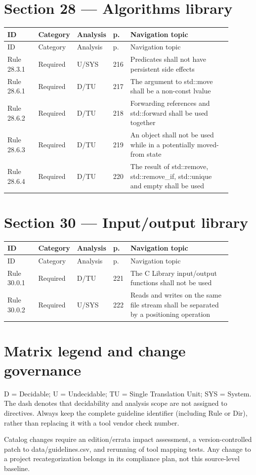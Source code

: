 \documentclass[10pt,letterpaper]{article}
\begin{document}
\section{Section 28 --- Algorithms library}
\small\setlength{\tabcolsep}{3pt}\renewcommand{\arraystretch}{1.15}
\begin{longtable}{p{0.14\linewidth}p{0.14\linewidth}p{0.1\linewidth}p{0.045\linewidth}p{0.475\linewidth}}
\toprule
ID & Category & Analysis & p. & Navigation topic\\ \midrule
\endfirsthead
\toprule
ID & Category & Analysis & p. & Navigation topic\\ \midrule
\endhead
Rule 28.3.1 & Required & U/SYS & 216 & Predicates shall not have persistent side effects\\
Rule 28.6.1 & Required & D/TU & 217 & The argument to std::move shall be a non-const lvalue\\
Rule 28.6.2 & Required & D/TU & 218 & Forwarding references and std::forward shall be used together\\
Rule 28.6.3 & Required & D/TU & 219 & An object shall not be used while in a potentially moved-from state\\
Rule 28.6.4 & Required & D/TU & 220 & The result of std::remove, std::remove\_if, std::unique and empty shall be used\\
\bottomrule
\end{longtable}
\normalsize

\section{Section 30 --- Input/output library}
\small\setlength{\tabcolsep}{3pt}\renewcommand{\arraystretch}{1.15}
\begin{longtable}{p{0.14\linewidth}p{0.14\linewidth}p{0.1\linewidth}p{0.045\linewidth}p{0.475\linewidth}}
\toprule
ID & Category & Analysis & p. & Navigation topic\\ \midrule
\endfirsthead
\toprule
ID & Category & Analysis & p. & Navigation topic\\ \midrule
\endhead
Rule 30.0.1 & Required & D/TU & 221 & The C Library input/output functions shall not be used\\
Rule 30.0.2 & Required & U/SYS & 222 & Reads and writes on the same file stream shall be separated by a positioning operation\\
\bottomrule
\end{longtable}
\normalsize

\section{Matrix legend and change governance}
D = Decidable; U = Undecidable; TU = Single Translation Unit; SYS = System. The dash denotes that decidability and analysis scope are not assigned to directives. Always keep the complete guideline identifier (including Rule or Dir), rather than replacing it with a tool vendor check number.

Catalog changes require an edition/errata impact assessment, a version-controlled patch to data/guidelines.csv, and rerunning of tool mapping tests. Any change to a project recategorization belongs in its compliance plan, not this source-level baseline.
\end{document}
